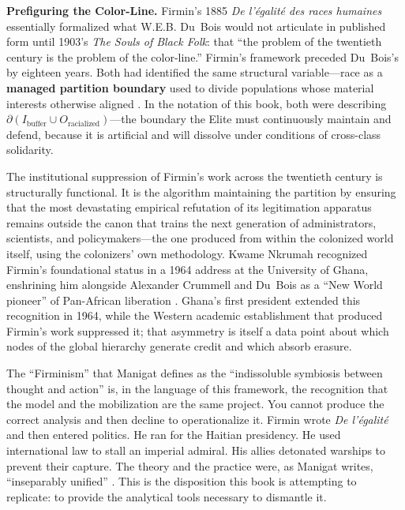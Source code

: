 \textbf{Prefiguring the Color-Line.} Firmin's 1885 \textit{De l'égalité des races humaines} essentially formalized what W.E.B. Du~Bois would not articulate in published form until 1903's \textit{The Souls of Black Folk}: that ``the problem of the twentieth century is the problem of the color-line.'' Firmin's framework preceded Du~Bois's by eighteen years. Both had identified the same structural variable---race as a \textbf{managed partition boundary} used to divide populations whose material interests otherwise aligned \cite{firmin_legacy}. In the notation of this book, both were describing $\partial(I_{\text{buffer}} \cup O_{\text{racialized}})$---the boundary the Elite must continuously maintain and defend, because it is artificial and will dissolve under conditions of cross-class solidarity.

The institutional suppression of Firmin's work across the twentieth century is structurally functional. It is the algorithm maintaining the partition by ensuring that the most devastating empirical refutation of its legitimation apparatus remains outside the canon that trains the next generation of administrators, scientists, and policymakers---the one produced from within the colonized world itself, using the colonizers' own methodology. Kwame Nkrumah recognized Firmin's foundational status in a 1964 address at the University of Ghana, enshrining him alongside Alexander Crummell and Du~Bois as a ``New World pioneer'' of Pan-African liberation \cite{firmin_legacy}. Ghana's first president extended this recognition in 1964, while the Western academic establishment that produced Firmin's work suppressed it; that asymmetry is itself a data point about which nodes of the global hierarchy generate credit and which absorb erasure.

The ``Firminism'' that Manigat defines as the ``indissoluble symbiosis between thought and action'' \cite{manigat} is, in the language of this framework, the recognition that the model and the mobilization are the same project. You cannot produce the correct analysis and then decline to operationalize it. Firmin wrote \textit{De l'\'{e}galit\'{e}} and then entered politics. He ran for the Haitian presidency. He used international law to stall an imperial admiral. His allies detonated warships to prevent their capture. The theory and the practice were, as Manigat writes, ``inseparably unified'' \cite{manigat}. This is the disposition this book is attempting to replicate: to provide the analytical tools necessary to dismantle it.

